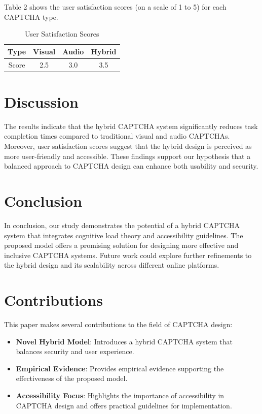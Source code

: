 Table 2 shows the user satisfaction scores (on a scale of 1 to 5) for each CAPTCHA type.

\begin{table}[ht]
\centering
\caption{User Satisfaction Scores}
\label{tab:satisfaction_scores}
\begin{tabular}{|c|c|c|c|}
\hline
\textbf{Type} & \textbf{Visual} & \textbf{Audio} & \textbf{Hybrid} \\
\hline
Score & 2.5 & 3.0 & 3.5 \\
\hline
\end{tabular}
\end{table}

\section{Discussion}
The results indicate that the hybrid CAPTCHA system significantly reduces task completion times compared to traditional visual and audio CAPTCHAs. Moreover, user satisfaction scores suggest that the hybrid design is perceived as more user-friendly and accessible. These findings support our hypothesis that a balanced approach to CAPTCHA design can enhance both usability and security.

\section{Conclusion}
In conclusion, our study demonstrates the potential of a hybrid CAPTCHA system that integrates cognitive load theory and accessibility guidelines. The proposed model offers a promising solution for designing more effective and inclusive CAPTCHA systems. Future work could explore further refinements to the hybrid design and its scalability across different online platforms.

\section{Contributions}
This paper makes several contributions to the field of CAPTCHA design:
\begin{itemize}
  \item \textbf{Novel Hybrid Model}: Introduces a hybrid CAPTCHA system that balances security and user experience.
  \item \textbf{Empirical Evidence}: Provides empirical evidence supporting the effectiveness of the proposed model.
  \item \textbf{Accessibility Focus}: Highlights the importance of accessibility in CAPTCHA design and offers practical guidelines for implementation.
\end{itemize}

